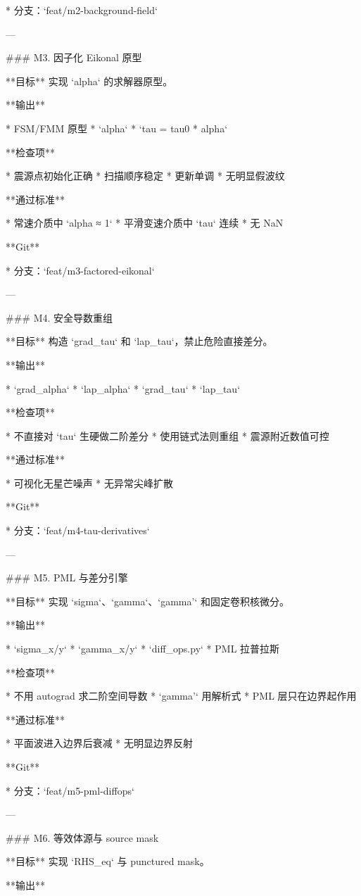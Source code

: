 * 分支：`feat/m2-background-field`

---

### M3. 因子化 Eikonal 原型

**目标**
实现 `alpha` 的求解器原型。

**输出**

* FSM/FMM 原型
* `alpha`
* `tau = tau0 * alpha`

**检查项**

* 震源点初始化正确
* 扫描顺序稳定
* 更新单调
* 无明显假波纹

**通过标准**

* 常速介质中 `alpha ≈ 1`
* 平滑变速介质中 `tau` 连续
* 无 NaN

**Git**

* 分支：`feat/m3-factored-eikonal`

---

### M4. 安全导数重组

**目标**
构造 `grad_tau` 和 `lap_tau`，禁止危险直接差分。

**输出**

* `grad_alpha`
* `lap_alpha`
* `grad_tau`
* `lap_tau`

**检查项**

* 不直接对 `tau` 生硬做二阶差分
* 使用链式法则重组
* 震源附近数值可控

**通过标准**

* 可视化无星芒噪声
* 无异常尖峰扩散

**Git**

* 分支：`feat/m4-tau-derivatives`

---

### M5. PML 与差分引擎

**目标**
实现 `sigma`、`gamma`、`gamma'` 和固定卷积核微分。

**输出**

* `sigma_x/y`
* `gamma_x/y`
* `diff_ops.py`
* PML 拉普拉斯

**检查项**

* 不用 autograd 求二阶空间导数
* `gamma'` 用解析式
* PML 层只在边界起作用

**通过标准**

* 平面波进入边界后衰减
* 无明显边界反射

**Git**

* 分支：`feat/m5-pml-diffops`

---

### M6. 等效体源与 source mask

**目标**
实现 `RHS_eq` 与 punctured mask。

**输出**

